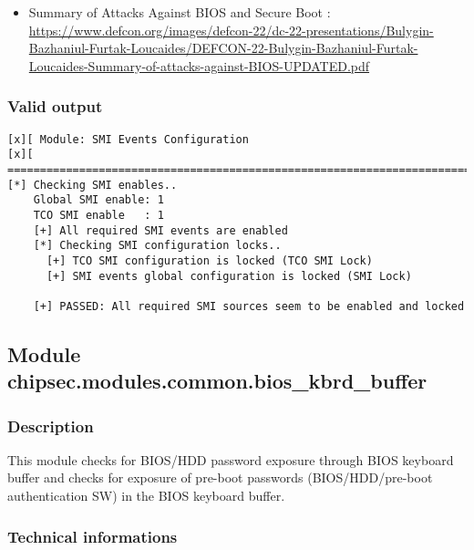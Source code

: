 \begin{itemize}
\tightlist
\item
  Summary of Attacks Against BIOS and Secure Boot :
  \url{https://www.defcon.org/images/defcon-22/dc-22-presentations/Bulygin-Bazhaniul-Furtak-Loucaides/DEFCON-22-Bulygin-Bazhaniul-Furtak-Loucaides-Summary-of-attacks-against-BIOS-UPDATED.pdf}
\end{itemize}

\hypertarget{valid-output-14}{%
\subsubsection{Valid output}\label{valid-output-14}}

\begin{verbatim}
[x][ Module: SMI Events Configuration
[x][ =======================================================================
[*] Checking SMI enables..
    Global SMI enable: 1
    TCO SMI enable   : 1
    [+] All required SMI events are enabled
    [*] Checking SMI configuration locks..
      [+] TCO SMI configuration is locked (TCO SMI Lock)
      [+] SMI events global configuration is locked (SMI Lock)

    [+] PASSED: All required SMI sources seem to be enabled and locked
\end{verbatim}

\hypertarget{module-chipsec.modules.common.bios_kbrd_buffer}{%
\subsection{Module
chipsec.modules.common.bios\_kbrd\_buffer}\label{module-chipsec.modules.common.bios_kbrd_buffer}}

\hypertarget{description-15}{%
\subsubsection{Description}\label{description-15}}

This module checks for BIOS/HDD password exposure through BIOS keyboard
buffer and checks for exposure of pre-boot passwords (BIOS/HDD/pre-boot
authentication SW) in the BIOS keyboard buffer.

\hypertarget{technical-informations-14}{%
\subsubsection{Technical informations}\label{technical-informations-14}}

